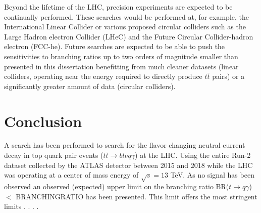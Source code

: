 Beyond the lifetime of the LHC, precision experiments are expected to be continually performed.  These searches would be performed at, for example, the International Linear Collider \cite{Buesser:2013pza} or various proposed circular colliders such as the Large Hadron electron Collider (LHeC) and the Future Circular Collider-hadron electron (FCC-he)\cite{Benedikt:2015kqj}.  Future searches are expected to be able to push the sensitivities to branching ratios up to two orders of magnitude smaller than presented in this dissertation\cite{Cakir:2018ruj} benefitting from much cleaner datasets (linear colliders, operating near the energy required to directly produce $t\bar{t}$ pairs) or a significantly greater amount of data (circular colliders).

\section{Conclusion}

A search has been performed to search for the flavor changing neutral current decay in top quark pair events ($t\bar{t}\rightarrow bl\nu q \gamma$) at the LHC.  Using the entire Run-2 dataset collected by the ATLAS detector between 2015 and 2018 while the LHC was operating at a center of mass energy of $\sqrt{s}=13$ TeV.  As no signal has been observed an observed (expected) upper limit on the branching ratio BR($t\rightarrow q \gamma$) $<$ BRANCHINGRATIO has been presented.  This limit offers the most stringent limits . . . .%

%
